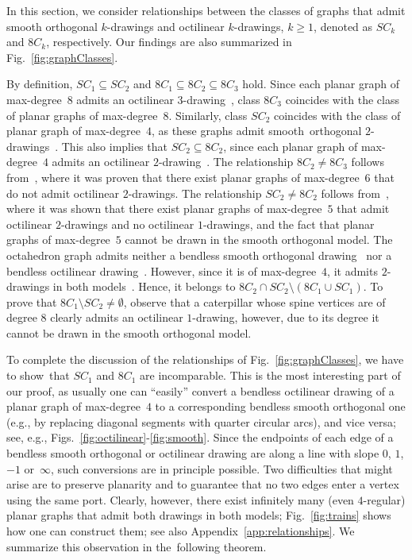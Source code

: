 In this section, we consider relationships between the classes of graphs that admit smooth orthogonal $k$-drawings and octilinear $k$-drawings, $k \geq 1$, denoted as $SC_k$ and $8C_k$, respectively. Our findings are also summarized in Fig.~\ref{fig:graphClasses}.

By definition, $SC_1 \subseteq SC_2$ and $8C_1 \subseteq 8C_2 \subseteq 8C_3$ hold. Since each planar graph of max-degree~$8$ admits an octilinear $3$-drawing~\cite{slopes}, class $8C_3$ coincides with the class of planar graphs of max-degree~$8$. Similarly, class $SC_2$ coincides with the class of planar graph of max-degree~$4$, as these graphs admit smooth~orthogonal $2$-drawings~\cite{smog2}. This also implies that $SC_2 \subseteq 8C_2$, since each planar graph of max-degree~$4$ admits an octilinear $2$-drawing~\cite{octi}. The relationship $8C_2 \neq 8C_3$ follows from~\cite{octi}, where it was proven that there exist planar graphs of max-degree~$6$ that do not admit octilinear $2$-drawings. The relationship $SC_2 \neq 8C_2$ follows from~\cite{octi-2}, where it was shown that there exist planar graphs of max-degree~$5$ that admit octilinear $2$-drawings and no octilinear $1$-drawings, and the fact that planar graphs of max-degree~$5$ cannot be drawn in the smooth orthogonal model. The octahedron graph admits neither a bendless smooth orthogonal drawing~\cite{smog1} nor a bendless octilinear drawing~\cite{octi-2}. However, since it is of max-degree~$4$, it admits $2$-drawings in both models~\cite{smog2,octi}. Hence, it belongs to $8C_2 \cap SC_2 \setminus (8C_1 \cup SC_1)$. To prove that $8C_1 \setminus SC_2 \neq \emptyset$, observe that a caterpillar whose spine vertices are of degree 8 clearly admits an octilinear $1$-drawing, however, due to its degree it cannot be drawn in the smooth orthogonal model.

To complete the discussion of the relationships of Fig.~\ref{fig:graphClasses}, we have to show~that $SC_1$ and $8C_1$ are incomparable. This is the most interesting part of our proof, as usually one can ``easily'' convert a bendless octilinear drawing of a planar graph of max-degree~$4$ to a corresponding bendless smooth orthogonal one (e.g., by replacing diagonal segments with quarter circular arcs), and vice versa; see, e.g., Figs.~\ref{fig:octilinear}-\ref{fig:smooth}. Since the endpoints of each edge of a bendless smooth orthogonal or octilinear drawing are along a line with slope $0$, $1$, $-1$ or~$\infty$, such conversions are in principle possible. Two difficulties that might arise are to preserve planarity and to guarantee that no two edges enter a vertex using the same port. Clearly, however, there exist infinitely many (even $4$-regular) planar graphs that admit both drawings in both models; Fig.~\ref{fig:trains} shows how one can construct them; see also Appendix~\ref{app:relationships}. We summarize this observation in the~following theorem.

